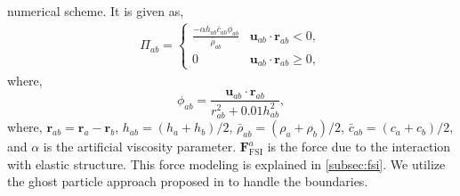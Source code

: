 \documentclass[10pt, conference]{FMFP2022}
\newcommand{\ten}[1]{\ensuremath{\mathbf{#1}}}
\begin{document}
numerical scheme. It is given as,
\begin{align}
  \label{eq:mom-av}
  \Pi_{ab} =
  \begin{cases}
\frac{-\alpha h_{ab} \bar{c}_{ab} \phi_{ab}}{\bar{\rho}_{ab}}
  & \ten{u}_{ab}\cdot \ten{r}_{ab} < 0, \\
  0 & \ten{u}_{ab}\cdot \ten{r}_{ab} \ge 0,
\end{cases}
\end{align}
where,
%
\begin{equation}
  \label{eq:av-phiij}
  \phi_{ab} = \frac{\ten{u}_{ab} \cdot \ten{r}_{ab}}{r^2_{ab} + 0.01 h^2_{ab}},
\end{equation}
%
where, $\ten{r}_{ab} = \ten{r}_a - \ten{r}_b$, $h_{ab} = (h_a + h_b)/2$,
$\bar{\rho}_{ab} = (\rho_a + \rho_b)/2$, $\bar{c}_{ab} = (c_a + c_b) / 2$, and
$\alpha$ is the artificial viscosity parameter. $\ten{F}^a_{\text{FSI}}$ is the
force due to the interaction with elastic structure. This force modeling is
explained in \cref{subsec:fsi}. We utilize the ghost particle approach proposed
in \cite{Adami2012} to handle the boundaries.
\end{document}
